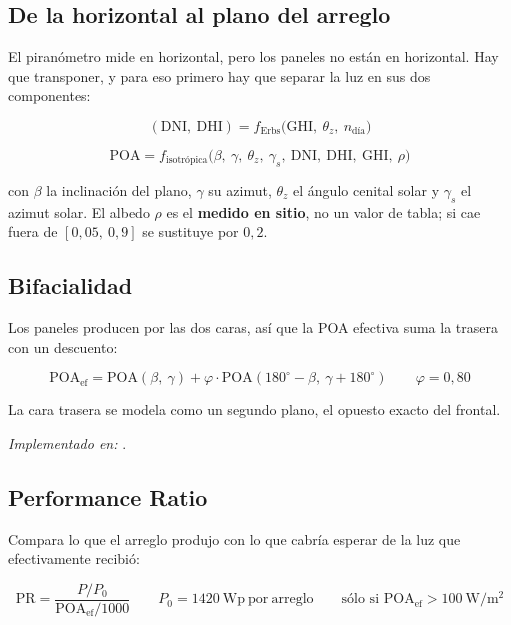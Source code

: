 \documentclass[11pt,a4paper]{article}
\begin{document}
\subsection{De la horizontal al plano del arreglo}

El piranómetro mide en horizontal, pero los paneles no están en horizontal. Hay que
transponer, y para eso primero hay que separar la luz en sus dos componentes:

\begin{equation*}
  (\mathrm{DNI},\ \mathrm{DHI}) = f_{\text{Erbs}}\big(\mathrm{GHI},\ \theta_z,\ n_{\text{día}}\big)
\end{equation*}

\begin{equation*}
  \mathrm{POA} = f_{\text{isotrópica}}\big(\beta,\ \gamma,\ \theta_z,\ \gamma_s,\
  \mathrm{DNI},\ \mathrm{DHI},\ \mathrm{GHI},\ \rho\big)
\end{equation*}

con $\beta$ la inclinación del plano, $\gamma$ su azimut, $\theta_z$ el ángulo cenital
solar y $\gamma_s$ el azimut solar. El albedo $\rho$ es el \textbf{medido en sitio}, no un
valor de tabla; si cae fuera de $[0{,}05,\ 0{,}9]$ se sustituye por $0{,}2$.

\subsection{Bifacialidad}

Los paneles producen por las dos caras, así que la POA efectiva suma la trasera con un
descuento:

\begin{equation*}
  \mathrm{POA_{ef}} = \mathrm{POA}(\beta,\ \gamma)
  + \varphi \cdot \mathrm{POA}(180^\circ - \beta,\ \gamma + 180^\circ)
  \qquad \varphi = 0{,}80
\end{equation*}

La cara trasera se modela como un segundo plano, el opuesto exacto del frontal.

\emph{Implementado en:} .

\subsection{Performance Ratio}

Compara lo que el arreglo produjo con lo que cabría esperar de la luz que efectivamente
recibió:

\begin{equation*}
  \mathrm{PR} = \frac{P / P_0}{\mathrm{POA_{ef}} / 1000}
  \qquad
  P_0 = 1420\ \mathrm{Wp\ por\ arreglo}
  \qquad
  \text{sólo si } \mathrm{POA_{ef}} > 100\ \mathrm{W/m^2}
\end{equation*}
\end{document}
